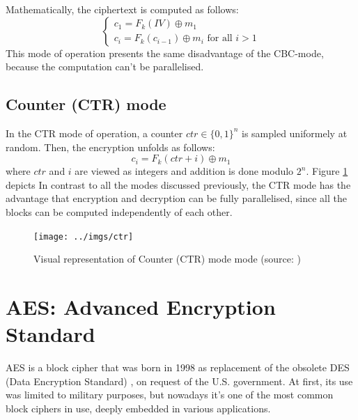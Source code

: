\documentclass[12pt,a4paper]{book}
\theoremstyle{definition}
\begin{document}
 	Mathematically, the ciphertext is computed as follows:
 	\[
 	\begin{cases}
 		c_1 = F_k(IV) \oplus m_1\\
 		c_i = F_k(c_{i-1}) \oplus m_i \text{ for all } i>1
 	\end{cases}
 	\]
 	This mode of operation presents the same disadvantage of the CBC-mode, because the computation can't be parallelised.
	\subsection{Counter (CTR) mode}
	In the CTR mode of operation, a counter $ctr \in \{0,1\}^n$ is sampled uniformely at random. Then, the encryption unfolds as follows:
	\[
		c_i = F_k(ctr + i) \oplus m_1
	\]
	where $ctr$ and $i$ are viewed as integers and addition is done modulo $2^n$. Figure \ref{fig:ctr} depicts In contrast to all the modes discussed previously, the CTR mode has the advantage that encryption and decryption can be fully parallelised, since all the blocks can be computed independently of each other.
	\begin{figure}[!ht]
		\centering
		\texttt{[image: ../imgs/ctr]}
		\captionsetup{width=.7\linewidth}
		\caption{Visual representation of Counter (CTR) mode mode (source: \cite{Katz2007})}
		\label{fig:ctr}
	\end{figure}
	
	\section{AES: Advanced Encryption Standard}\label{sec:aes}
	AES \cite{Katz2007} \cite{AES-FIPS} is a block cipher that was born in 1998 as replacement of the obsolete DES (Data Encryption Standard) \cite{DES1999}, on request of the U.S. government. At first, its use was limited to military purposes, but nowadays it’s one of the most common block ciphers in use, deeply embedded in various applications. 
	
\end{document}
